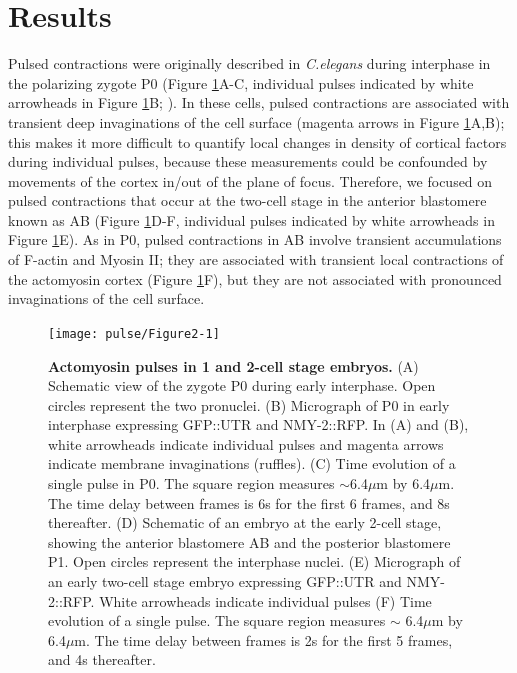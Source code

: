 \section{Results}
Pulsed contractions were originally described in \textit{C.elegans} during interphase in the polarizing zygote P0 (Figure \ref{fig:221}A-C, individual pulses indicated by white arrowheads in Figure \ref{fig:221}B;  \cite{Munro:2004jk}). In these cells, pulsed contractions are associated with transient deep invaginations of the cell surface (magenta arrows in Figure \ref{fig:221}A,B); this makes it more difficult to quantify local changes in density of cortical factors during individual pulses, because these measurements could be confounded by movements of the cortex in/out of the plane of focus. Therefore, we focused on pulsed contractions that occur at the two-cell stage in the anterior blastomere known as AB (Figure \ref{fig:221}D-F, individual pulses indicated by white arrowheads in Figure \ref{fig:221}E).  As in P0, pulsed contractions in AB involve transient accumulations of F-actin and Myosin II; they are associated with transient local contractions of the actomyosin cortex (Figure \ref{fig:221}F), but they are not associated with pronounced invaginations of the cell surface. 

\begin{figure}[!htbp]
\centering
\texttt{[image: pulse/Figure2-1]}
\caption[Actomyosin pulses in 1 and 2-cell stage embryos.]{\label{fig:221} \textbf{Actomyosin pulses in 1 and 2-cell stage embryos.} (A) Schematic view of the zygote P0 during early interphase.  Open circles represent the two pronuclei. (B) Micrograph of P0 in early interphase expressing GFP::UTR and NMY-2::RFP. In (A) and (B), white arrowheads indicate individual pulses and magenta arrows indicate membrane invaginations (ruffles). (C) Time evolution of a single pulse in P0. The square region measures $\sim$6.4$\mu$m by 6.4$\mu$m.  The time delay between frames is 6s for the first 6 frames, and 8s thereafter. (D) Schematic of an embryo at the early 2-cell stage, showing the anterior blastomere AB and the posterior blastomere P1.  Open circles represent the interphase nuclei. (E) Micrograph of an early two-cell stage embryo expressing GFP::UTR and NMY-2::RFP. White arrowheads indicate individual pulses (F) Time evolution of a single pulse. The square region measures $\sim$ 6.4$\mu$m by 6.4$\mu$m.  The time delay between frames is 2s for the first 5 frames, and 4s thereafter.}
\end{figure}


